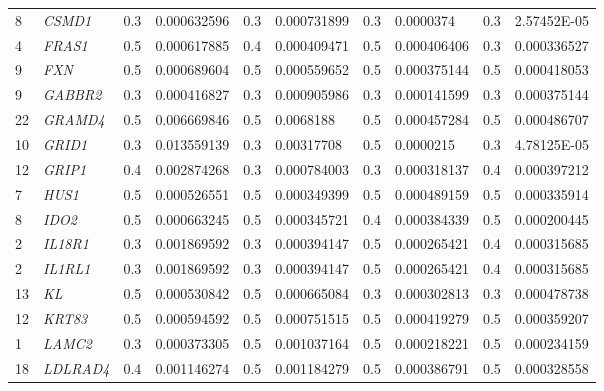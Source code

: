\begin{refsection}
\begin{otherlanguage}{english}
\begin{scriptsize}
\begin{longtable}{llllllllll}
8 & \cellcolor[HTML]{FE996B}\textit{CSMD1} & 0.3 & 0.000632596 & 0.3 & 0.000731899 & 0.3 & 0.0000374 & 0.3 & 2.57452E-05 \\
4 & \cellcolor[HTML]{FE996B}\textit{FRAS1} & 0.5 & 0.000617885 & 0.4 & \cellcolor[HTML]{FE996B}0.000409471 & 0.5 & 0.000406406 & 0.3 & 0.000336527 \\
9 & \cellcolor[HTML]{FE996B}\textit{FXN} & 0.5 & 0.000689604 & 0.5 & 0.000559652 & 0.5 & 0.000375144 & 0.5 & 0.000418053 \\
9 & \cellcolor[HTML]{FE996B}\textit{GABBR2} & 0.3 & \cellcolor[HTML]{FE996B}0.000416827 & 0.3 & 0.000905986 & 0.3 & 0.000141599 & 0.3 & 0.000375144 \\
22 & \cellcolor[HTML]{FE996B}\textit{GRAMD4} & 0.5 & 0.006669846 & 0.5 & 0.0068188 & 0.5 & 0.000457284 & 0.5 & 0.000486707 \\
10 & \cellcolor[HTML]{FE996B}\textit{GRID1} & 0.3 & 0.013559139 & 0.3 & 0.00317708 & 0.5 & 0.0000215 & 0.3 & 4.78125E-05 \\
12 & \cellcolor[HTML]{FE996B}\textit{GRIP1} & 0.4 & 0.002874268 & 0.3 & 0.000784003 & 0.3 & 0.000318137 & 0.4 & 0.000397212 \\
7 & \cellcolor[HTML]{FE996B}\textit{HUS1} & 0.5 & 0.000526551 & 0.5 & \cellcolor[HTML]{FE996B}0.000349399 & 0.5 & 0.000489159 & 0.5 & 0.000335914 \\
8 & \cellcolor[HTML]{FE996B}\textit{IDO2} & 0.5 & 0.000663245 & 0.5 & \cellcolor[HTML]{FE996B}0.000345721 & 0.4 & 0.000384339 & 0.5 & 0.000200445 \\
2 & \cellcolor[HTML]{FE996B}\textit{IL18R1} & 0.3 & 0.001869592 & 0.3 & \cellcolor[HTML]{FE996B}0.000394147 & 0.5 & 0.000265421 & 0.4 & 0.000315685 \\
2 & \cellcolor[HTML]{FE996B}\textit{IL1RL1} & 0.3 & 0.001869592 & 0.3 & \cellcolor[HTML]{FE996B}0.000394147 & 0.5 & 0.000265421 & 0.4 & 0.000315685 \\
13 & \cellcolor[HTML]{FE996B}\textit{KL} & 0.5 & 0.000530842 & 0.5 & 0.000665084 & 0.3 & 0.000302813 & 0.3 & 0.000478738 \\
12 & \cellcolor[HTML]{FE996B}\textit{KRT83} & 0.5 & 0.000594592 & 0.5 & 0.000751515 & 0.5 & 0.000419279 & 0.5 & 0.000359207 \\
1 & \cellcolor[HTML]{FE996B}\textit{LAMC2} & 0.3 & \cellcolor[HTML]{FE996B}0.000373305 & 0.5 & 0.001037164 & 0.5 & 0.000218221 & 0.5 & 0.000234159 \\
18 & \cellcolor[HTML]{FE996B}\textit{LDLRAD4} & 0.4 & 0.001146274 & 0.5 & 0.001184279 & 0.5 & 0.000386791 & 0.5 & 0.000328558 \\

\end{longtable}
\end{scriptsize}
\end{otherlanguage}
\end{refsection}

